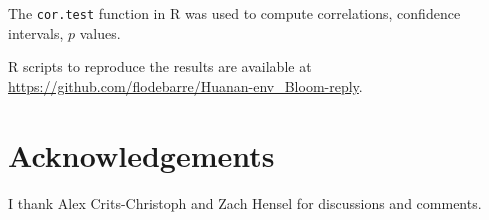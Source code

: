 \documentclass[11pt]{article}
\begin{document}
The \texttt{cor.test} function in R was used to compute correlations, confidence intervals, $p$ values.

R scripts to reproduce the results are available at \url{https://github.com/flodebarre/Huanan-env_Bloom-reply}.

\section{Acknowledgements} I thank Alex Crits-Christoph and Zach Hensel for discussions and comments. 



\end{document}
